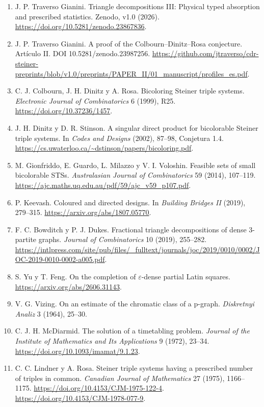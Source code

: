 \documentclass[spanish,11pt,a4paper]{article}
\providecommand{\tightlist}{\setlength{\itemsep}{0pt}\setlength{\parskip}{0pt}}
\begin{document}
\begin{enumerate}
\def\labelenumi{\arabic{enumi}.}
\tightlist
\item
  J. P. Traverso Gianini. Triangle decompositions III: Physical typed absorption and prescribed statistics. Zenodo, v1.0 (2026). \url{https://doi.org/10.5281/zenodo.23867836}.
\item
  J. P. Traverso Gianini. A proof of the Colbourn--Dinitz--Rosa conjecture. Artículo II. DOI 10.5281/zenodo.23987256. \url{https://github.com/jtraverso/cdr-steiner-preprints/blob/v1.0/preprints/PAPER_II/01_manuscript/profiles_es.pdf}.
\item
  C. J. Colbourn, J. H. Dinitz y A. Rosa. Bicoloring Steiner triple systems. \emph{Electronic Journal of Combinatorics} 6 (1999), R25. \url{https://doi.org/10.37236/1457}.
\item
  J. H. Dinitz y D. R. Stinson. A singular direct product for bicolorable Steiner triple systems. In \emph{Codes and Designs} (2002), 87--98, Conjetura 1.4. \url{https://cs.uwaterloo.ca/~dstinson/papers/bicoloring.pdf}.
\item
  M. Gionfriddo, E. Guardo, L. Milazzo y V. I. Voloshin. Feasible sets of small bicolorable STSs. \emph{Australasian Journal of Combinatorics} 59 (2014), 107--119. \url{https://ajc.maths.uq.edu.au/pdf/59/ajc_v59_p107.pdf}.
\item
  P. Keevash. Coloured and directed designs. In \emph{Building Bridges II} (2019), 279--315. \url{https://arxiv.org/abs/1807.05770}.
\item
  F. C. Bowditch y P. J. Dukes. Fractional triangle decompositions of dense 3-partite graphs. \emph{Journal of Combinatorics} 10 (2019), 255--282. \url{https://intlpress.com/site/pub/files/_fulltext/journals/joc/2019/0010/0002/JOC-2019-0010-0002-a005.pdf}.
\item
  S. Yu y T. Feng. On the completion of \(\varepsilon\)-dense partial Latin squares. \url{https://arxiv.org/abs/2606.31143}.
\item
  V. G. Vizing. On an estimate of the chromatic class of a p-graph. \emph{Diskretnyi Analiz} 3 (1964), 25--30.
\item
  C. J. H. McDiarmid. The solution of a timetabling problem. \emph{Journal of the Institute of Mathematics and Its Applications} 9 (1972), 23--34. \url{https://doi.org/10.1093/imamat/9.1.23}.
\item
  C. C. Lindner y A. Rosa. Steiner triple systems having a prescribed number of triples in common. \emph{Canadian Journal of Mathematics} 27 (1975), 1166--1175. \url{https://doi.org/10.4153/CJM-1975-122-4}. \url{https://doi.org/10.4153/CJM-1978-077-9}.

\end{enumerate}
\end{document}

